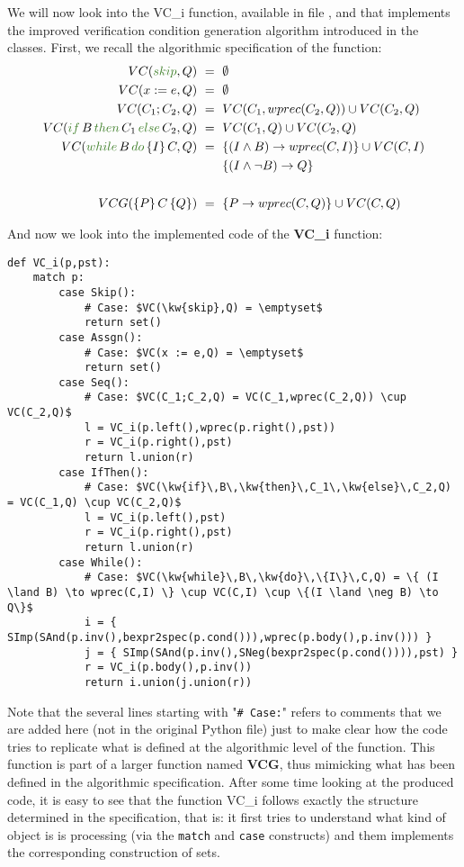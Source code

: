 \documentclass[11pt]{article}
\newcommand{\kw}[1]{{\color{OliveGreen}{#1}}}
\begin{document}
We will now look into the VC\_i function, available in file , and that implements the improved verification condition generation algorithm introduced in the classes. First, we recall the algorithmic specification of the function:
\begin{align*}
VC(\kw{skip},Q) & ~=~ \emptyset\\
VC(x := e,Q)    & ~=~ \emptyset\\
VC(C_1;C_2,Q)   & ~=~ VC(C_1,wprec(C_2,Q)) \cup VC(C_2,Q)\\
VC(\kw{if}\,B\,\kw{then}\,C_1\,\kw{else}\,C_2,Q) & ~=~ VC(C_1,Q) \cup VC(C_2,Q)\\
VC(\kw{while}\,B\,\kw{do}\,\{I\}\,C,Q) & ~=~ \{ (I \land B) \to wprec(C,I) \} \cup VC(C,I)\\
& \:\:\:\:\:\:\:\:\:\{(I \land \neg B) \to Q\}\\
& \\
VCG(\{P\}\,C\,\{Q\}) & ~=~ \{P \to wprec(C,Q)\} \cup VC(C,Q)
\end{align*}

And now we look into the implemented code of the \textbf{VC\_i} function:
\begin{lstlisting}[style=Python]
def VC_i(p,pst):
    match p:
        case Skip():
            # Case: $VC(\kw{skip},Q) = \emptyset$
            return set()
        case Assgn():
            # Case: $VC(x := e,Q) = \emptyset$
            return set()
        case Seq():
            # Case: $VC(C_1;C_2,Q) = VC(C_1,wprec(C_2,Q)) \cup VC(C_2,Q)$ 
            l = VC_i(p.left(),wprec(p.right(),pst))
            r = VC_i(p.right(),pst)
            return l.union(r)
        case IfThen():
            # Case: $VC(\kw{if}\,B\,\kw{then}\,C_1\,\kw{else}\,C_2,Q) = VC(C_1,Q) \cup VC(C_2,Q)$
            l = VC_i(p.left(),pst)
            r = VC_i(p.right(),pst)
            return l.union(r)
        case While():
            # Case: $VC(\kw{while}\,B\,\kw{do}\,\{I\}\,C,Q) = \{ (I \land B) \to wprec(C,I) \} \cup VC(C,I) \cup \{(I \land \neg B) \to Q\}$
            i = { SImp(SAnd(p.inv(),bexpr2spec(p.cond())),wprec(p.body(),p.inv())) }
            j = { SImp(SAnd(p.inv(),SNeg(bexpr2spec(p.cond()))),pst) }
            r = VC_i(p.body(),p.inv())
            return i.union(j.union(r))  
\end{lstlisting}

Note that the several lines starting with "\lstinline!# Case:!" refers to comments that we are added here (not in the original Python file) just to make clear how the code tries to replicate what is defined at the algorithmic level of the function. This function is part of a larger function named \textbf{VCG}, thus mimicking what has been defined in the algorithmic specification. After some time looking at the produced code, it is easy to see that the function VC\_i follows exactly the structure determined in the specification, that is: it first tries to understand what kind of object is is processing (via the \lstinline!match! and \lstinline!case! constructs) and them implements the corresponding construction of sets.
\end{document}
